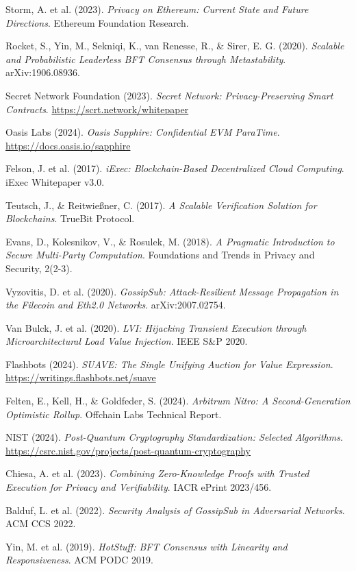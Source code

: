 \documentclass[11pt,letterpaper]{article}
\begin{document}
\begin{thebibliography}{99}

Storm, A. et al. (2023). \textit{Privacy on Ethereum: Current State and Future Directions}. Ethereum Foundation Research.

Rocket, S., Yin, M., Sekniqi, K., van Renesse, R., \& Sirer, E. G. (2020). \textit{Scalable and Probabilistic Leaderless BFT Consensus through Metastability}. arXiv:1906.08936.

Secret Network Foundation (2023). \textit{Secret Network: Privacy-Preserving Smart Contracts}. \url{https://scrt.network/whitepaper}

Oasis Labs (2024). \textit{Oasis Sapphire: Confidential EVM ParaTime}. \url{https://docs.oasis.io/sapphire}

Felson, J. et al. (2017). \textit{iExec: Blockchain-Based Decentralized Cloud Computing}. iExec Whitepaper v3.0.

Teutsch, J., \& Reitwießner, C. (2017). \textit{A Scalable Verification Solution for Blockchains}. TrueBit Protocol.

Evans, D., Kolesnikov, V., \& Rosulek, M. (2018). \textit{A Pragmatic Introduction to Secure Multi-Party Computation}. Foundations and Trends in Privacy and Security, 2(2-3).

Vyzovitis, D. et al. (2020). \textit{GossipSub: Attack-Resilient Message Propagation in the Filecoin and Eth2.0 Networks}. arXiv:2007.02754.

Van Bulck, J. et al. (2020). \textit{LVI: Hijacking Transient Execution through Microarchitectural Load Value Injection}. IEEE S\&P 2020.

Flashbots (2024). \textit{SUAVE: The Single Unifying Auction for Value Expression}. \url{https://writings.flashbots.net/suave}

Felten, E., Kell, H., \& Goldfeder, S. (2024). \textit{Arbitrum Nitro: A Second-Generation Optimistic Rollup}. Offchain Labs Technical Report.

NIST (2024). \textit{Post-Quantum Cryptography Standardization: Selected Algorithms}. \url{https://csrc.nist.gov/projects/post-quantum-cryptography}

Chiesa, A. et al. (2023). \textit{Combining Zero-Knowledge Proofs with Trusted Execution for Privacy and Verifiability}. IACR ePrint 2023/456.

Balduf, L. et al. (2022). \textit{Security Analysis of GossipSub in Adversarial Networks}. ACM CCS 2022.

Yin, M. et al. (2019). \textit{HotStuff: BFT Consensus with Linearity and Responsiveness}. ACM PODC 2019.

\end{thebibliography}
\end{document}
